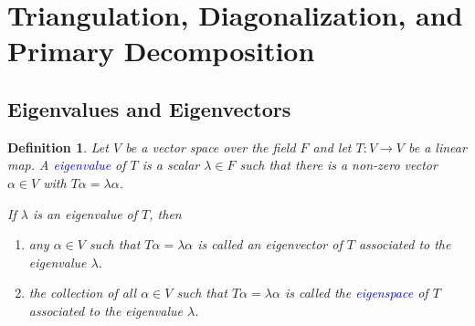 \documentclass[11pt]{article}
\theoremstyle{thmstyle}
\newtheorem{lemma}[theorem]{Lemma}
\theoremstyle{defstyle}
\newtheorem{definition}[theorem]{Definition}
\newcommand{\define}[1]{\textcolor{blue}{\textit{#1}}}
\renewcommand{\ge}{\geqslant}
\begin{document}


    

\section{Triangulation, Diagonalization, and Primary Decomposition}

\subsection{Eigenvalues and Eigenvectors}

\begin{definition}
    Let $V$ be a vector space over the field $F$ and let $T\colon V\to V$ be a linear map. A \define{eigenvalue} of $T$ is a scalar $\lambda\in F$ such that there is a non-zero vector $\alpha\in V$ with $T\alpha = \lambda\alpha$. 

    If $\lambda$ is an eigenvalue of $T$, then 
    \begin{enumerate}[label=(\roman*)]
        \item any $\alpha\in V$ such that $T\alpha = \lambda\alpha$ is called an eigenvector of $T$ associated to the eigenvalue $\lambda$.
        \item the collection of all $\alpha\in V$ such that $T\alpha = \lambda\alpha$ is called the \define{eigenspace} of $T$ associated to the eigenvalue $\lambda$.
    \end{enumerate}
\end{definition}
\end{document}
